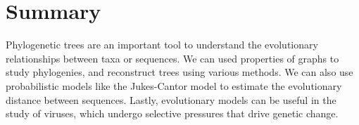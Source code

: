 \documentclass[12pt]{article}
\begin{document}
\section{Summary}
Phylogenetic trees are an important tool to understand the evolutionary relationships between taxa or sequences. We can used properties of graphs to study phylogenies, and reconstruct trees using various methods. We can also use probabilistic models like the Jukes-Cantor model to estimate the evolutionary distance between sequences. Lastly, evolutionary models can be useful in the study of viruses, which undergo selective pressures that drive genetic change.
\end{document}
